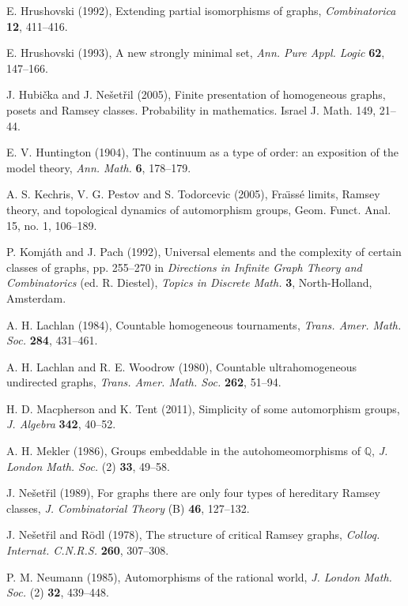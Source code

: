 \documentclass[12pt]{article}
\begin{document}
\begin{thebibliography}{99}
E. Hrushovski (1992),
Extending partial isomorphisms of graphs,
\textit{Combinatorica} \textbf{12}, 411--416.

E. Hrushovski (1993),
A new strongly minimal set,
\textit{Ann. Pure Appl. Logic} \textbf{62}, 147--166.

J. Hubi\v{c}ka and J. Ne\v{s}et\v{r}il (2005),
Finite presentation of homogeneous graphs, posets and Ramsey classes.
Probability in mathematics. Israel J. Math. 149, 21--44.

E. V. Huntington (1904),
The continuum as a type of order: an exposition of the model theory,
\textit{Ann. Math.} \textbf{6}, 178--179.

A. S. Kechris, V. G. Pestov and S. Todorcevic (2005),
Fra\"{\i}ss\'e limits, Ramsey theory, and topological dynamics of
automorphism groups,
Geom. Funct. Anal. 15, no. 1, 106--189.

P. Komj\'{a}th and J. Pach (1992),
Universal elements and the complexity of certain classes of graphs,
pp. 255--270 in \textit{Directions in Infinite Graph Theory and Combinatorics}
(ed. R. Diestel),
\textit{Topics in Discrete Math.} \textbf{3}, North-Holland, Amsterdam.

A. H. Lachlan (1984),
Countable homogeneous tournaments,
\textit{Trans. Amer. Math. Soc.} \textbf{284}, 431--461.

A. H. Lachlan and R. E. Woodrow (1980),
Countable ultrahomogeneous undirected graphs,
\textit{Trans. Amer. Math. Soc.} \textbf{262}, 51--94.

H. D. Macpherson and K. Tent (2011), 
Simplicity of some automorphism groups,
\textit{J. Algebra} \textbf{342}, 40--52.

A. H. Mekler (1986),
Groups embeddable in the autohomeomorphisms of $\mathbb{Q}$,
\textit{J. London Math. Soc.} (2) \textbf{33}, 49--58.

J. Ne\v{s}et\v{r}il (1989),
For graphs there are only four types of hereditary Ramsey classes,
\textit{J. Combinatorial Theory} (B) \textbf{46}, 127--132.

J. Ne\v{s}et\v{r}il and R\"{o}dl (1978),
The structure of critical Ramsey graphs,
\textit{Colloq. Internat. C.N.R.S.} \textbf{260}, 307--308.

P. M. Neumann (1985),
Automorphisms of the rational world,
\textit{J. London Math. Soc.} (2) \textbf{32}, 439--448.


\end{thebibliography}
\end{document}
